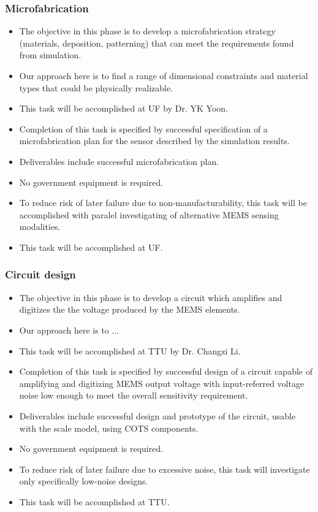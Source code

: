 \subsubsection{Microfabrication}
\begin{itemize}
\item The objective in this phase is to develop a microfabrication strategy (materials, deposition, patterning) that can meet the requirements found from simulation.
\item Our approach here is to find a range of dimensional constraints and material types that could be physically realizable.
\item This task will be accomplished at UF by Dr. YK Yoon.
\item Completion of this task is specified by successful specification of a microfabrication plan for the sensor described by the simulation results.
\item Deliverables include successful microfabrication plan.
\item No government equipment is required.
\item To reduce risk of later failure due to non-manufacturability, this task will be accomplished with paralel investigating of alternative MEMS sensing modalities.
\item This task will be accomplished at UF.
\end{itemize}
\subsubsection{Circuit design}
\begin{itemize}
\item The objective in this phase is to develop a circuit which amplifies and digitizes the the voltage produced by the MEMS elements.
\item Our approach here is to ...
\item This task will be accomplished at TTU by Dr. Changzi Li.
\item Completion of this task is specified by successful design of a circuit capable of amplifying and digitizing MEMS output voltage with input-referred voltage noise low enough to meet the overall sensitivity requirement.
\item Deliverables include successful design and prototype of the circuit, usable with the scale model, using COTS components.
\item No government equipment is required.
\item To reduce risk of later failure due to excessive noise, this task will investigate only specifically low-noise designs.
\item This task will be accomplished at TTU.
\end{itemize}
